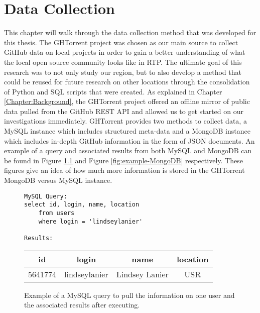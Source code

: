 \chapter{Data Collection}
\label{Chapter:Collection}

This chapter will walk through the data collection method that was developed for this thesis. The GHTorrent project was chosen as our main source to collect GitHub data on local projects in order to gain a better understanding of what the local open source community looks like in RTP. The ultimate goal of this research was to not only study our region, but to also develop a method that could be reused for future research on other locations through the consolidation of Python and SQL scripts that were created. As explained in Chapter \ref{Chapter:Background}, the GHTorrent project offered an offline mirror of public data pulled from the GitHub REST API and allowed us to get started on our investigations immediately. GHTorrent provides two methods to collect data, a MySQL instance which includes structured meta-data and a MongoDB instance which includes in-depth GitHub information in the form of JSON documents. An example of a query and associated results from both MySQL and MongoDB can be found in Figure \ref{fig:example-MySQL} and Figure \ref{fig:example-MongoDB} respectively. These figures give an idea of how much more information is stored in the GHTorrent MongoDB versus MySQL instance.

\begin{figure}
\footnotesize
\begin{lstlisting}
MySQL Query:
select id, login, name, location 
	from users 
	where login = 'lindseylanier'

Results:
\end{lstlisting}
\centering
\footnotesize
\begin{tabular}{|c|c|c|c|}
\hline
id & login & name & location \\
\hline
5641774 & lindseylanier & Lindsey Lanier & USR \\
\hline
\end{tabular}

\caption{Example of a MySQL query to pull the information on one user and the associated results after executing.}
\label{fig:example-MySQL}
\end{figure}


